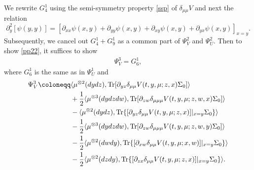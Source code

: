 \documentclass{amsart}
\theoremstyle{definition}
\theoremstyle{remark}
\def\D{\partial}
\numberwithin{equation}{section}
\begin{document}
We rewrite $G_4^1$ using the semi-symmetry property \eqref{ssp} of $\delta_{\mu\mu} V$
 and next the relation
 $$
\partial_y^2 [\psi(y,y)]=[\partial_{xx} \psi(x,y) + \partial_{yy} \psi(x,y)
+ \partial_{xy} \psi(x,y)+\partial_{yx} \psi(x,y)]_{x=y}.
 $$
Subsequently, we cancel out $G_4^1+G_9^1$ as a common part of
$\Psi_V^2$ and $\Psi_U^2$.
Then to show \eqref{pp22}, it suffices to show
\begin{align}\label{pg31}
\Psi^3_V=G_6^1,
\end{align}
where $G_6^1$ is the same as in $\Psi_U^1$ and
{\allowdisplaybreaks
\begin{align*}
\Psi_V^3 \coloneqq
& \langle \mu^{\otimes2}(dydz), {\rm Tr} [ \D_{yz}\delta_{\mu\mu} V(t,y, \mu;z,x)  \Sigma_0]\rangle \notag  \\
&+\frac{1}{2}\langle\mu^{\otimes3}(dydzdw), {\rm Tr}[\D_{zw}\delta_{\mu\mu\mu} V (t, y, \mu; z,w,x)
\Sigma_0]\rangle \notag\\
&- \langle \mu^{\otimes2}(dydz), {\rm Tr}\{ [ \D_{yz}\delta_{\mu\mu} V(t,y, \mu;z,x)]|_{x=y}  \Sigma_0 \}\rangle \notag  \\
&-\frac{1}{2}\langle\mu^{\otimes3}(dydzdw), {\rm Tr}[\D_{zw}\delta_{\mu\mu\mu} V (t, y, \mu; z,w,y)
\Sigma_0]\rangle \notag\\
& - \frac{1}{2}\langle\mu^{\otimes2}(dwdy), {\rm Tr}\{[\D_{xw}\delta_{\mu\mu} V (t, y, \mu; x,w)]|_{x=y}
\Sigma_0\}\rangle\\
& - \frac{1}{2}\langle\mu^{\otimes2}(dzdy), {\rm Tr}\{[\D_{zx}\delta_{\mu\mu} V (t, y, \mu; z,x)]|_{x=y}
\Sigma_0\}\rangle.
\end{align*}
}
\end{document}
